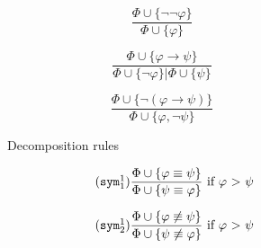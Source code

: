 \documentclass{article}
\makeatletter
\theoremstyle{definition}
\newcommand{\leqnomode}{\tagsleft@true\let\veqno\@@leqno}
\makeatother
\begin{document}
\leqnomode
\begin{figure}
    \begin{subfigure}{\textwidth}
        \centering
        \begin{subfigure}{0.3\textwidth}
            \begin{equation}
                \tag{$\lnot$}
                \frac{
                    \Phi \cup \{ \lnot \lnot \varphi \}}%
                { \Phi \cup \{\varphi\} }
            \end{equation}
        \end{subfigure}
        \begin{subfigure}{0.3\textwidth}
            \begin{equation}
                \tag{$\rightarrow$}
                \frac{
                    \Phi \cup \{ \varphi \rightarrow \psi \}}%
                { \Phi \cup \{ \lnot \varphi \} | \Phi \cup \{ \psi \} }
            \end{equation}
        \end{subfigure}
        \begin{subfigure}{0.3\textwidth}
            \begin{equation}
                \tag{$\lnot \rightarrow$}
                \frac{
                    \Phi \cup \{\lnot ( \varphi \rightarrow \psi ) \}}%
                { \Phi \cup \{ \varphi, \lnot \psi \} }
            \end{equation}
        \end{subfigure}
        \caption{Decomposition rules}
    \end{subfigure}
    \begin{subfigure}{\textwidth}
        \centering
        \begin{subfigure}{0.4\textwidth}
            \begin{equation}
                \tag{$\texttt{sym}_1^1$}
                \frac{
                    \Phi \cup \{ \varphi \equiv \psi \} }%
                { \Phi \cup \{\psi \equiv \varphi\} }
                \text{ if $\varphi$ > $\psi$}
            \end{equation}
        \end{subfigure}
        \begin{subfigure}{0.4\textwidth}
            \begin{equation}
                \tag{$\texttt{sym}_2^1$}
                \frac{
                    \Phi \cup \{ \varphi \not \equiv \psi \}}%
                { \Phi \cup \{\psi \not \equiv \varphi\} }
                \text{ if $\varphi$ > $\psi$}

\end{equation}
\end{subfigure}
\end{subfigure}
\end{figure}
\end{document}
